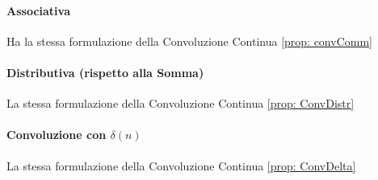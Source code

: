 \paragraph{Associativa} Ha la stessa formulazione della Convoluzione Continua \eqref{prop: convComm}
\paragraph{Distributiva (rispetto alla Somma)} La stessa formulazione della Convoluzione Continua \eqref{prop: ConvDistr}
\paragraph{Convoluzione con $\delta(n)$} La stessa formulazione della Convoluzione Continua \eqref{prop: ConvDelta}